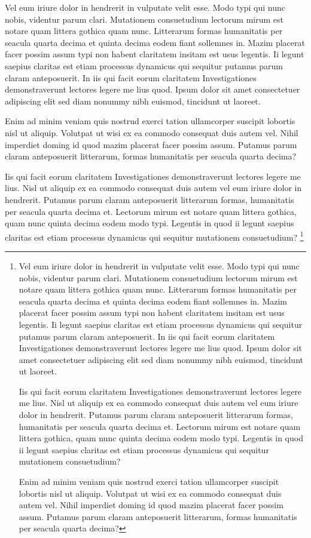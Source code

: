\documentclass[a4paper,12pt]{scrartcl}
\begin{document}
Vel eum iriure dolor in hendrerit in vulputate velit esse. Modo typi qui nunc nobis, videntur parum clari. Mutationem consuetudium lectorum mirum est notare quam littera gothica quam nunc. Litterarum formas humanitatis per seacula quarta decima et quinta decima eodem fiant sollemnes in. Mazim placerat facer possim assum typi non habent claritatem insitam est usus legentis. Ii legunt saepius claritas est etiam processus dynamicus qui sequitur putamus parum claram anteposuerit. In iis qui facit eorum claritatem Investigationes demonstraverunt lectores legere me lius quod. Ipsum dolor sit amet consectetuer adipiscing elit sed diam nonummy nibh euismod, tincidunt ut laoreet.

Enim ad minim veniam quis nostrud exerci tation ullamcorper suscipit lobortis nisl ut aliquip. Volutpat ut wisi ex ea commodo consequat duis autem vel. Nihil imperdiet doming id quod mazim placerat facer possim assum. Putamus parum claram anteposuerit litterarum, formas humanitatis per seacula quarta decima?

Iis qui facit eorum claritatem Investigationes demonstraverunt lectores legere me lius. Nisl ut aliquip ex ea commodo consequat duis autem vel eum iriure dolor in hendrerit. Putamus parum claram anteposuerit litterarum formas, humanitatis per seacula quarta decima et. Lectorum mirum est notare quam littera gothica, quam nunc quinta decima eodem modo typi. Legentis in quod ii legunt saepius claritas est etiam processus dynamicus qui sequitur mutationem consuetudium?
\footnote{Vel eum iriure dolor in hendrerit in vulputate velit esse. Modo typi qui nunc nobis, videntur parum clari. Mutationem consuetudium lectorum mirum est notare quam littera gothica quam nunc. Litterarum formas humanitatis per seacula quarta decima et quinta decima eodem fiant sollemnes in. Mazim placerat facer possim assum typi non habent claritatem insitam est usus legentis. Ii legunt saepius claritas est etiam processus dynamicus qui sequitur putamus parum claram anteposuerit. In iis qui facit eorum claritatem Investigationes demonstraverunt lectores legere me lius quod. Ipsum dolor sit amet consectetuer adipiscing elit sed diam nonummy nibh euismod, tincidunt ut laoreet.

Iis qui facit eorum claritatem Investigationes demonstraverunt lectores legere me lius. Nisl ut aliquip ex ea commodo consequat duis autem vel eum iriure dolor in hendrerit. Putamus parum claram anteposuerit litterarum formas, humanitatis per seacula quarta decima et. Lectorum mirum est notare quam littera gothica, quam nunc quinta decima eodem modo typi. Legentis in quod ii legunt saepius claritas est etiam processus dynamicus qui sequitur mutationem consuetudium?

Enim ad minim veniam quis nostrud exerci tation ullamcorper suscipit lobortis nisl ut aliquip. Volutpat ut wisi ex ea commodo consequat duis autem vel. Nihil imperdiet doming id quod mazim placerat facer possim assum. Putamus parum claram anteposuerit litterarum, formas humanitatis per seacula quarta decima?}
\end{document}
